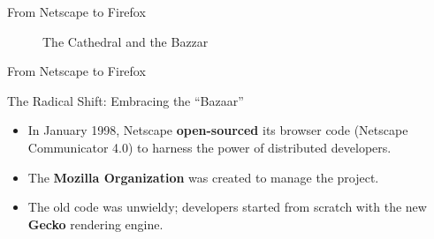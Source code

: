\documentclass{beamer}
\begin{document}
\begin{frame}[t]{From Netscape to Firefox}
    \begin{figure}
        \caption{The Cathedral and the Bazzar}
    \end{figure}
\end{frame}

\begin{frame}[t]{From Netscape to Firefox}
\begin{block}{The Radical Shift: Embracing the ``Bazaar''}
\begin{itemize}
    \item In January 1998, Netscape \textbf{open-sourced} its browser code (Netscape Communicator 4.0) to harness the power of distributed developers.
    \item The \textbf{Mozilla Organization} was created to manage the project.
    \item The old code was unwieldy; developers started from scratch with the new \textbf{Gecko} rendering engine.
\end{itemize}
\end{block}

\end{frame}
\end{document}
